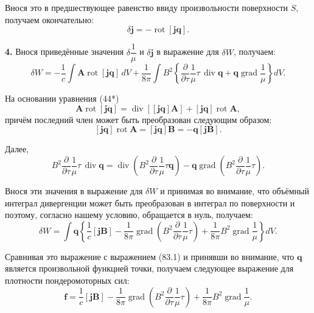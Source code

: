 \documentclass[a4paper,12pt]{article}
\begin{document}
Внося это в предшествующее равенство ввиду произвольности поверхности
$S$, получаем окончательно:
\begin{equation}
    \delta\mathbf{j} = -\operatorname{rot}[\mathbf{j}\mathbf{q}].
    \tag{83.2}
\end{equation}

\textbf{4.} Внося приведённые значения $\delta\dfrac{1}{\mu}$ и
$\delta\mathbf{j}$ в выражение для $\delta W$, получаем:
$$
    \delta W = -\frac{1}{c}\int\mathbf{A}\operatorname{rot}[\mathbf{j}\mathbf{q}]\,dV
             + \frac{1}{8\pi}\int B^2\!\left\{
                 \frac{\partial}{\partial\tau}\frac{1}{\mu}\tau\,\operatorname{div}\mathbf{q}
                 + \mathbf{q}\operatorname{grad}\frac{1}{\mu}
               \right\}dV.
$$

На основании уравнения (44*)
$$
    \mathbf{A}\operatorname{rot}[\mathbf{j}\mathbf{q}]
    = \operatorname{div}[[\mathbf{j}\mathbf{q}]\mathbf{A}]
    + [\mathbf{j}\mathbf{q}]\operatorname{rot}\mathbf{A},
$$
причём последний член может быть преобразован следующим образом:
$$
    [\mathbf{j}\mathbf{q}]\operatorname{rot}\mathbf{A}
    = [\mathbf{j}\mathbf{q}]\mathbf{B}
    = -\mathbf{q}[\mathbf{j}\mathbf{B}].
$$

Далее,
$$
    B^2\frac{\partial}{\partial\tau}\frac{1}{\mu}\tau\,\operatorname{div}\mathbf{q}
    = \operatorname{div}\!\left(B^2\frac{\partial}{\partial\tau}\frac{1}{\mu}\tau\mathbf{q}\right)
    - \mathbf{q}\operatorname{grad}\!\left(B^2\frac{\partial}{\partial\tau}\frac{1}{\mu}\tau\right).
$$

Внося эти значения в выражение для $\delta W$ и принимая во внимание,
что объёмный интеграл дивергенции может быть преобразован в интеграл
по поверхности и поэтому, согласно нашему условию, обращается в нуль,
получаем:
$$
    \delta W = \int\mathbf{q}\left\{
        \frac{1}{c}[\mathbf{j}\mathbf{B}]
        - \frac{1}{8\pi}\operatorname{grad}\!\left(B^2\frac{\partial}{\partial\tau}\frac{1}{\mu}\tau\right)
        + \frac{1}{8\pi}B^2\operatorname{grad}\frac{1}{\mu}
    \right\}dV.
$$

Сравнивая это выражение с выражением (83.1) и принявши во внимание,
что $\mathbf{q}$ является произвольной функцией точки, получаем следующее
выражение для плотности пондеромоторных сил:
\begin{equation}
    \mathbf{f} = \frac{1}{c}[\mathbf{j}\mathbf{B}]
               - \frac{1}{8\pi}\operatorname{grad}\!\left(
                   B^2\frac{\partial}{\partial\tau}\frac{1}{\mu}\tau
               \right)
               + \frac{1}{8\pi}B^2\operatorname{grad}\frac{1}{\mu}.
    \tag{83.3}
\end{equation}
\end{document}
